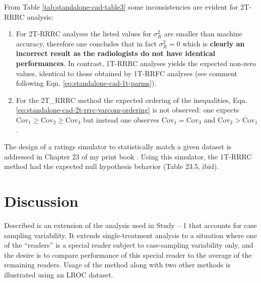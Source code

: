 \documentclass[
]{book}
\providecommand{\tightlist}{%
  \setlength{\itemsep}{0pt}\setlength{\parskip}{0pt}}
\begin{document}
From Table \ref{tab:standalone-cad-table3} some inconsistencies are evident for 2T-RRRC analysis:

\begin{enumerate}
\def\labelenumi{\arabic{enumi}.}
\tightlist
\item
  For 2T-RRRC analyses the listed values for \(\sigma_R^2\) are smaller than machine accuracy, therefore one concludes that in fact \(\sigma_R^2 = 0\) which is \textbf{clearly an incorrect result as the radiologists do not have identical performances}. In contrast, 1T-RRRC analyses yields the expected non-zero values, identical to those obtained by 1T-RRFC analyses (see comment following Eqn. \eqref{eq:standalone-cad-1t-parms}).
\item
  For the 2T\_RRRC method the expected ordering of the inequalities, Eqn. \eqref{eq:standalone-cad-2t-rrrc-varcom-ordering} is not observed: one expects \(\text{Cov}_1 \geq \text{Cov}_2 \geq \text{Cov}_3\) but instead one observes \(\text{Cov}_1 = \text{Cov}_3\) and \(\text{Cov}_2 > \text{Cov}_1\).
\end{enumerate}

The design of a ratings simulator to statistically match a given dataset is addressed in Chapter 23 of my print book \citep{chakraborty2017observer}. Using this simulator, the 1T-RRRC method had the expected null hypothesis behavior (Table 23.5, ibid).

\hypertarget{standalone-cad-radiologists-discussion}{%
\section{Discussion}\label{standalone-cad-radiologists-discussion}}

Described is an extension of the analysis used in Study -- 1 that accounts for case sampling variability. It extends \citep{hillis2005comparison} single-treatment analysis to a situation where one of the ``readers'' is a special reader subject to case-sampling variability only, and the desire is to compare performance of this special reader to the average of the remaining readers. Usage of the method along with two other methods is illustrated using an LROC dataset.
\end{document}
